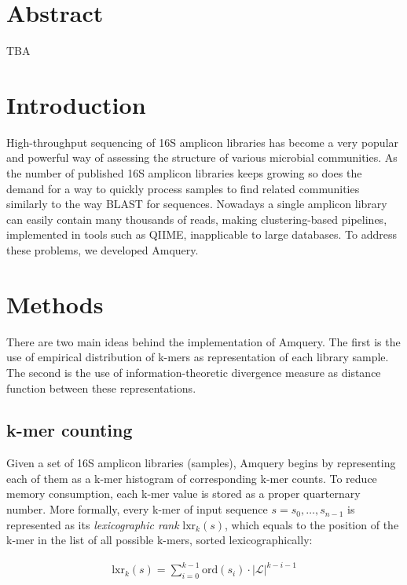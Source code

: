 \documentclass[10pt,letterpaper]{article}
\begin{document}
\section*{Abstract}
TBA

\linenumbers

\section*{Introduction}
High-throughput sequencing of 16S amplicon libraries has become a very popular and powerful way of assessing the structure of various microbial communities. As the number of published 16S amplicon libraries keeps growing so does the demand for a way to quickly process samples to find related communities similarly to the way BLAST for sequences. Nowadays a single amplicon library can easily contain many thousands of reads, making clustering-based pipelines, implemented in tools such as QIIME, inapplicable to large databases. To address these problems, we developed Amquery.


\section*{Methods}
There are two main ideas behind the implementation of Amquery. The first is the use of empirical distribution of k-mers as representation of each library sample. The second is the use of information-theoretic divergence measure as distance function between these representations. 

\subsection*{k-mer counting}
Given a set of 16S amplicon libraries (samples), Amquery begins by representing each of them as a k-mer histogram of corresponding k-mer counts. To reduce memory consumption, each k-mer value is stored as a proper quarternary number.
More formally, every k-mer of input sequence $s = s_0,\dots,s_{n-1}$ is represented as its \textit{lexicographic rank} $\mathrm{lxr}_k(s)$, which equals to the position of the k-mer in the list of all possible k-mers, sorted lexicographically:

\begin{eqnarray}
\label{eq:schemeP}
    \mathrm{lxr}_k(s) = \sum_{i=0}^{k−1} \mathrm{ord}(s_i) \cdot |{\mathcal{L}}|^{k−i−1}
\end{eqnarray}
\end{document}
